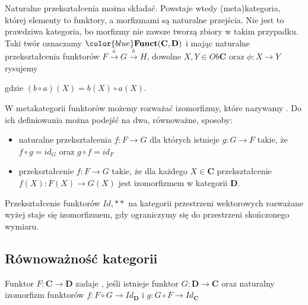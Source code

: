 Naturalne przekształcenia można składać. Powstaje wtedy (meta)kategoria, której elementy to funktory, a morfizmami są naturalne przejścia. Nie jest to prawdziwa kategoria, bo morfizmy nie zawsze tworzą zbiory w takim przypadku. Taki twór oznaczamy $\color{blue}\mathbf{Funct}(\mathbf{C},\mathbf{D})$ i mając naturalne przekształcenia funktorów $F\overset{a}{\to} G\overset{b}{\to}H$, dowolne $X,Y\in Ob\mathbf{C}$ oraz $\phi:X\to Y$ rysujemy
\begin{center}
\end{center}
gdzie $(b\circ a)(X)=b(X)\circ a(X)$.

\begin{definition}
  W metakategorii funktorów możemy rozważać izomorfizmy, które nazywamy . Do ich definiowania można podejść na dwa, równoważne, sposoby:
  \begin{itemize}
    \item naturalne przekształcenia $f:F\to G$ dla których istnieje $g:G\to F$ takie, że $f\circ g=id_G$ oraz $g\circ f=id_F$
    \item przekształcenie $f:F\to G$ takie, że dla każdego $X\in\mathbf{C}$ przekształcenie $f(X):F(X)\to G(X)$ jest izomorfizmem w kategorii $\mathbf{D}$.
  \end{itemize}
\end{definition}

\begin{example}
  \item Przekształcenie funktorów $Id, **$ na kategorii przestrzeni wektorowych rozważane wyżej staje się izomorfizmem, gdy ograniczymy się do przestrzeni skończonego wymiaru.
\end{example}

\subsection{Równoważność kategorii}

\begin{definition}
  Funktor $F:\mathbf{C}\to\mathbf{D}$ zadaje , jeśli istnieje funktor $G:\mathbf{D}\to\mathbf{C}$ oraz naturalny izomorfizm funktorów $f:F\circ G\to Id_{\mathbf{D}}$ i $g:G\circ F\to Id_{\mathbf{C}}$
\end{definition}

